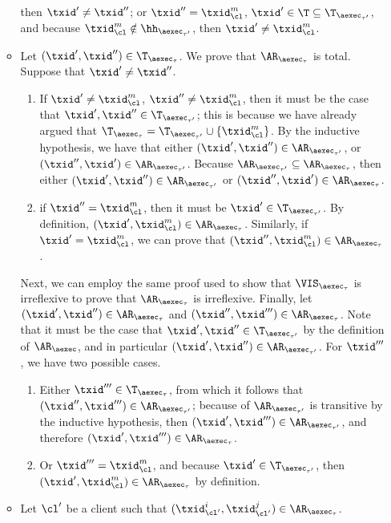 \begin{itemize}
\begin{itemize}
then $\txid' \neq \txid''$; or $\txid'' = \txid_{\cl}^{m}$, $\txid' \in \T \subseteq \T_{\aexec_{\tau'}}$, 
and because $\txid_{\cl}^{m} \notin \hh_{\aexec_{\tau'}}$, then $\txid' \neq \txid_{\cl}^{m}$. 
\item Let $(\txid', \txid'') \in \T_{\aexec_{\tau}}$. We prove that $\AR_{\aexec_{\tau}}$ is total. 
Suppose that $\txid' \neq \txid''$.
\begin{enumerate}
\item If $\txid' \neq 
\txid_{\cl}^{m}$, $\txid'' \neq \txid_{\cl}^{m}$, then it must be the case that $\txid', \txid'' \in \T_{\aexec_{\tau'}}$; 
this is because we have already argued that $\T_{\aexec_{\tau}} = \T_{\aexec_{\tau'}} \cup \{\txid_{\cl}^{m}\}$. 
By the inductive hypothesis, we have that either $(\txid', \txid'') \in \AR_{\aexec_{\tau'}}$, or 
$(\txid'', \txid') \in \AR_{\aexec_{\tau'}}$. Because $\AR_{\aexec_{\tau'}} \subseteq \AR_{\aexec_{\tau}}$, 
then either $(\txid', \txid'') \in \AR_{\aexec_{\tau'}}$ or $(\txid'', \txid') \in \AR_{\aexec_{\tau}}$. 
\item if $\txid'' = \txid_{\cl}^{m}$, then it must be $\txid' \in \T_{\aexec_{\tau'}}$. By definition, 
$(\txid', \txid_{\cl}^{m}) \in \AR_{\aexec_{\tau}}$. Similarly, if $\txid' = \txid_{\cl}^{m}$, we 
can prove that $(\txid'', \txid_{\cl}^{m}) \in \AR_{\aexec_{\tau}}$.
\end{enumerate}
Next, we can employ the same proof used to show that $\VIS_{\aexec_{\tau}}$ is irreflexive 
to prove that $\AR_{\aexec_{\tau}}$ is irreflexive. Finally, let 
$(\txid', \txid'') \in \AR_{\aexec_{\tau}}$ and $(\txid'', \txid''') \in \AR_{\aexec_{\tau}}$. 
Note that it must be the case that $\txid', \txid'' \in \T_{\aexec_{\tau'}}$ by the definition of 
$\AR_{\aexec}$, and in particular $(\txid', \txid'') \in \AR_{\aexec_{\tau'}}$. 
For $\txid'''$, we have two possible cases. 
\begin{enumerate}
\item Either $\txid''' \in \T_{\aexec_{\tau}}$, from 
which it follows that $(\txid'', \txid''') \in \AR_{\aexec_{\tau'}}$; because
of $\AR_{\aexec_{\tau'}}$ is transitive by the inductive hypothesis, then 
$(\txid', \txid''') \in \AR_{\aexec_{\tau'}}$, and therefore $(\txid' ,\txid''') \in 
\AR_{\aexec_{\tau}}$.
\item Or $\txid''' = \txid_{\cl}^{m}$, and because $\txid' \in \T_{\aexec_{\tau'}}$, then 
$(\txid', \txid_{\cl}^{m}) \in \AR_{\aexec_{\tau}}$ by definition. 
\end{enumerate}
\item Let $\cl'$ be a client such that $(\txid_{\cl'}^{i}, \txid_{\cl'}^{j}) \in \AR_{\aexec_{\tau}}$. 

\end{itemize}
\end{itemize}
